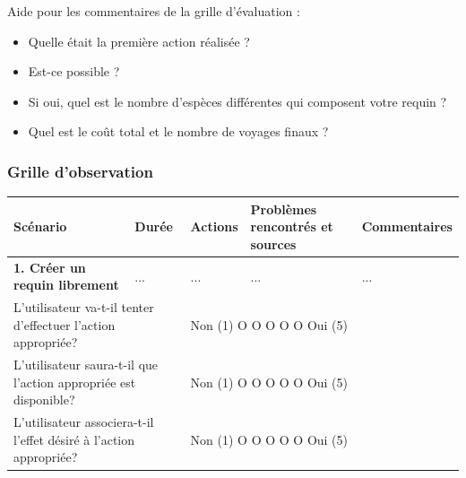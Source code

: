 \documentclass{article}
\begin{document}
Aide pour les commentaires de la grille d'évaluation :
\begin{itemize}
	\item Quelle était la première action réalisée ?
	\item Est-ce possible ?
	\item Si oui, quel est le nombre d'espèces différentes qui composent votre requin ?
	\item Quel est le coût total et le nombre de voyages finaux ?
\end{itemize}

\subsubsection{Grille d'observation}

\begin{table}[h]
	\centering
	\begin{tabular}{|p{6cm}|p{1.5cm}|p{1.5cm}|p{2.5cm}|p{3.5cm}|}
		\hline
		\textbf{Scénario}                                                                                                                         & \textbf{Durée}                                        & \textbf{Actions} & \textbf{Problèmes rencontrés et sources} & \textbf{Commentaires} \\ \hline
		\textbf{1. Créer un requin librement}                                                                                                     & ...                                                   & ...              & ...                                      & ...                   \\ \hline
		\multicolumn{2}{|p{7.5cm}|}{L’utilisateur va-t-il tenter d’effectuer l’action appropriée?}                                                & \multicolumn{3}{p{7.5cm}|}{Non (1) O O O O O Oui (5)}                                                                                       \\ \hline
		\multicolumn{2}{|p{7.5cm}|}{L’utilisateur saura-t-il que l’action appropriée est disponible?}                                             & \multicolumn{3}{p{7.5cm}|}{Non (1) O O O O O Oui (5)}                                                                                       \\ \hline
		\multicolumn{2}{|p{7.5cm}|}{L’utilisateur associera-t-il l’effet désiré à l’action appropriée?}                                           & \multicolumn{3}{p{7.5cm}|}{Non (1) O O O O O Oui (5)}                                                                                       \\ \hline

\end{tabular}
\end{table}
\end{document}
